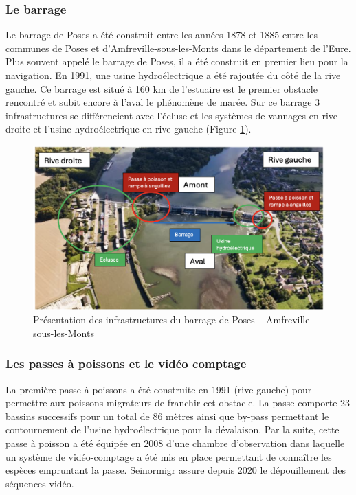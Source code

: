 \documentclass[11pt,titlepage,twoside]{article}\usepackage[]{graphicx}\usepackage[table]{xcolor}
\begin{document}
\subsubsection{Le barrage}


Le barrage de Poses a été construit entre les années 1878 et 1885 entre les communes de Poses et d’Amfreville-sous-les-Monts dans le département de l’Eure. Plus souvent appelé le barrage de Poses, il a été construit en premier lieu pour la navigation. En 1991, une usine hydroélectrique a été rajoutée du côté de la rive gauche. Ce barrage est situé à 160 km de l’estuaire est le premier obstacle rencontré et subit encore à l’aval le phénomène de marée. Sur ce barrage 3 infrastructures se différencient avec l’écluse et les systèmes de vannages en rive droite et l’usine hydroélectrique en rive gauche (Figure \ref{Barrage}). 


\begin{figure}[htpb]
\centering
\includegraphics[width=\textwidth]{Barrage}
\caption{Présentation des infrastructures du barrage de Poses – Amfreville-sous-les-Monts}
\label{Barrage}
\end{figure}

\subsubsection{Les passes à poissons et le vidéo comptage}


La première passe à poissons a été construite en 1991 (rive gauche) pour permettre aux poissons migrateurs de franchir cet obstacle. La passe comporte 23 bassins successifs pour un total de 86 mètres ainsi que by-pass permettant le contournement de l’usine hydroélectrique pour la dévalaison. Par la suite, cette passe à poisson a été équipée en 2008 d’une chambre d’observation dans laquelle un système de vidéo-comptage a été mis en place permettant de connaître les espèces empruntant la passe. Seinormigr assure depuis 2020 le dépouillement des séquences vidéo.
\end{document}
